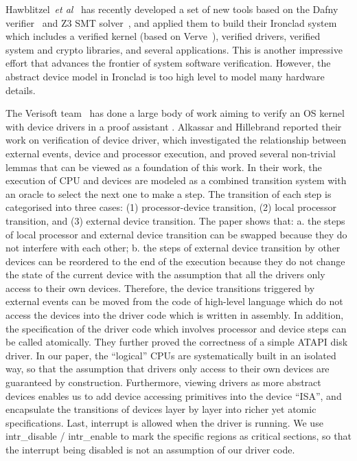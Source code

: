 Hawblitzel~{\em et al}~\cite{ironclad14} has recently developed a set
of new tools based on the Dafny verifier~\cite{dafny10} and Z3 SMT
solver~\cite{moura08}, and applied them to build their Ironclad system
which includes a verified kernel (based on Verve~\cite{hawblitzel10}),
verified drivers, verified system and crypto libraries, and several
applications.  This is another impressive effort that advances the
frontier of system software verification. However, the abstract device
model in Ironclad is too high level to model many hardware details.

The Verisoft team~\cite{verisoft07} has done a large body of work
aiming to verify an OS kernel with device drivers in a proof assistant
\cite{Alkassar:OSVE09,Alkassar:VSTTE08-225,Alkassar:VSTTE2010-71}.
Alkassar and Hillebrand \cite{Alkassar:VSTTE08-225} reported
their work on verification of device
driver, which investigated the relationship between external events, device
and processor execution, and proved several non-trivial lemmas that can be
viewed as a foundation of this work. In their work, the execution of CPU and
devices are modeled as a combined transition system with an oracle to select
the next one to make a step. The transition of each step is categorised into
three cases: (1) processor-device transition, (2) local processor transition,
and (3) external device transition. The paper shows that: a. the steps of
local processor and external device transition can be swapped because they do
not interfere with each other; b. the steps of external device transition by
other devices can be reordered to the end of the execution because they do not
change the state of the current device with the assumption that all the
drivers only access to their own devices. Therefore, the device transitions
triggered by external events can be moved from the code of high-level language
which do not access the devices into the driver code which is written in
assembly. In addition, the specification of the driver code which involves
processor and device steps can be called atomically. They further proved the
correctness of a simple ATAPI disk driver.
In our paper, the ``logical'' CPUs are systematically built in an isolated way,
so that the assumption that drivers only access to their own devices are
guaranteed by construction. Furthermore, viewing drivers as more abstract devices
enables us to add device accessing primitives into the device “ISA”, and
encapsulate the transitions of devices layer by layer into richer yet atomic
specifications. Last, interrupt is allowed when the driver is running. We use
\textsf{intr\_disable} / \textsf{intr\_enable} to mark the specific regions
as critical sections,
so that the interrupt being disabled is not an assumption of our driver code.


